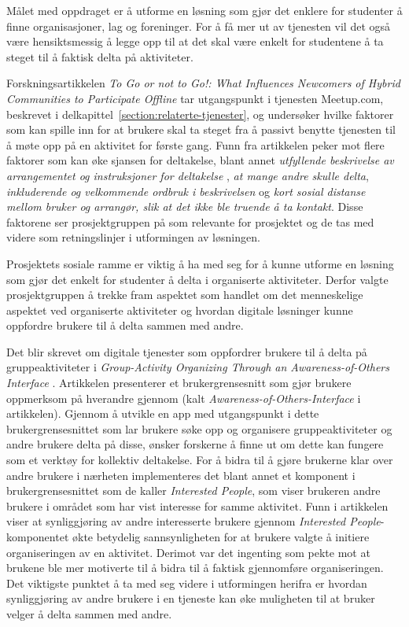 Målet med oppdraget er å utforme en løsning som gjør det enklere for studenter å finne organisasjoner, lag og foreninger. For å få mer ut av tjenesten vil det også være hensiktsmessig å legge opp til at det skal være enkelt for studentene å ta steget til å faktisk delta på aktiviteter.

Forskningsartikkelen {\em To Go or not to Go!: What Influences Newcomers of Hybrid Communities to Participate Offline} \cite{NEWCOMERS:4:CT17} tar utgangspunkt i tjenesten Meetup.com, beskrevet i delkapittel~\ref{section:relaterte-tjenester}, og undersøker hvilke faktorer som kan spille inn for at brukere skal ta steget fra å passivt benytte tjenesten til å møte opp på en aktivitet for første gang. Funn fra artikkelen peker mot flere faktorer som kan øke sjansen for deltakelse, blant annet {\em utfyllende beskrivelse av arrangementet og instruksjoner for deltakelse
}, {\em at mange andre skulle delta}, {\em inkluderende og velkommende ordbruk i beskrivelsen} og {\em kort sosial distanse mellom bruker og arrangør, slik at det ikke ble truende å ta kontakt}. Disse faktorene ser prosjektgruppen på som relevante for prosjektet og de tas med videre som retningslinjer i utformingen av løsningen.

Prosjektets sosiale ramme er viktig å ha med seg for å kunne utforme en løsning som gjør det enkelt for studenter å delta i organiserte aktiviteter. Derfor valgte prosjektgruppen å trekke fram aspektet som handlet om det menneskelige aspektet ved organiserte aktiviteter og hvordan digitale løsninger kunne oppfordre brukere til å delta sammen med andre.

Det blir skrevet om digitale tjenester som oppfordrer brukere til å delta på gruppeaktiviteter i {\em Group-Activity Organizing Through an Awareness-of-Others Interface} \cite{AWARENESS:3:CSCW18}. Artikkelen presenterer et brukergrensesnitt som gjør brukere oppmerksom på hverandre gjennom (kalt {\em Awareness-of-Others-Interface} i artikkelen). Gjennom å utvikle en app med utgangspunkt i dette brukergrensesnittet som lar brukere søke opp og organisere gruppeaktiviteter og andre brukere delta på disse, ønsker forskerne å finne ut om dette kan fungere som et verktøy for kollektiv deltakelse. For å bidra til å gjøre brukerne klar over andre brukere i nærheten implementeres det blant annet et komponent i brukergrensesnittet som de kaller {\em Interested People}, som viser brukeren andre brukere i området som har vist interesse for samme aktivitet. Funn i artikkelen viser at synliggjøring av andre interesserte brukere gjennom {\em Interested People}-komponentet økte betydelig sannsynligheten for at brukere valgte å initiere organiseringen av en aktivitet. Derimot var det ingenting som pekte mot at brukene ble mer motiverte til å bidra til å faktisk gjennomføre organiseringen. Det viktigste punktet å ta med seg videre i utformingen herifra er hvordan synliggjøring av andre brukere i en tjeneste kan øke muligheten til at bruker velger å delta sammen med andre.

